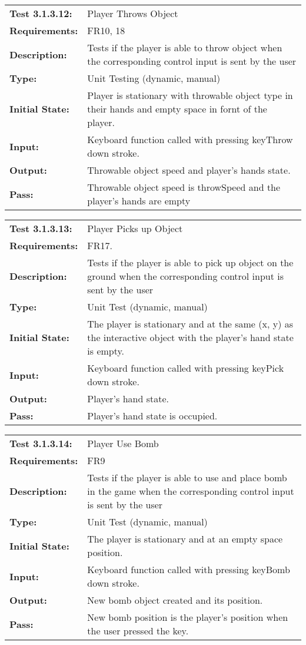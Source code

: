 \documentclass[12pt, titlepage]{article}
\begin{document}
\begin{tabular}{|l|p{10cm}|}
    \hline
    \bf{Test} 3.1.3.12: & Player Throws Object \\
    \bf{Requirements}: & FR10, 18\\
    \bf{Description}: &Tests if the player is able to throw object when the corresponding control input is sent by the user \\
    \bf{Type}: & Unit Testing (dynamic, manual) \\
    \bf{Initial State}: & Player is stationary with throwable object type in their hands and empty space in fornt of the player. \\
    \bf{Input}: & Keyboard function called with pressing keyThrow down stroke. \\
    \bf{Output}: & Throwable object speed and player's hands state.\\
    \bf{Pass}: & Throwable object speed is throwSpeed and the player's hands are empty\\
    \hline
\end{tabular}

\begin{tabular}{|l|p{10cm}|}
    \hline
    \bf{Test} 3.1.3.13: & Player Picks up Object \\
    \bf{Requirements}: & FR17.\\
    \bf{Description}: & Tests if the player is able to pick up object on the ground when the corresponding control input is sent by the user \\
    \bf{Type}: & Unit Test (dynamic, manual) \\
    \bf{Initial State}: & The player is stationary and at the same (x, y) as the interactive object with the player's hand state is empty.\\
    \bf{Input}: & Keyboard function called with pressing keyPick down stroke. \\
    \bf{Output}: & Player's hand state.\\
    \bf{Pass}: & Player's hand state is occupied.\\
    \hline
\end{tabular}

\begin{tabular}{|l|p{10cm}|}
    \hline
    \bf{Test} 3.1.3.14: & Player Use Bomb \\
    \bf{Requirements}: & FR9\\
    \bf{Description}: & Tests if the player is able to use and place bomb in the game when the corresponding control input is sent by the user \\
    \bf{Type}: & Unit Test (dynamic, manual) \\
    \bf{Initial State}: & The player is stationary and at an empty space position. \\
    \bf{Input}: & Keyboard function called with pressing keyBomb down stroke. \\
    \bf{Output}: & New bomb object created and its  position.\\
    \bf{Pass}: & New bomb position is the player's position when the user pressed the key.\\
    \hline
\end{tabular}
\end{document}
